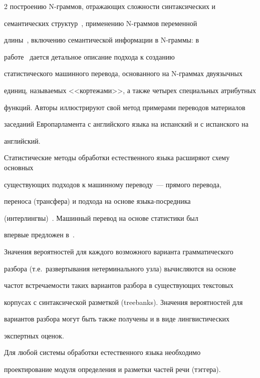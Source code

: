 \begin{multicols}{2}
построению N-грам\-мов, от\-ра\-жа\-ющих сложности синтаксических и 


семантических структур~\cite{29koz, 30koz}, применению N-грам\-мов переменной 


длины~\cite{31koz}, включению семантической информации в N-грам\-мы: в 


работе~\cite{32koz} дается детальное описание подхода к созданию 


статистического машинного перевода, основанного на N-грам\-мах двуязычных 


единиц, называемых <<кортежами>>, а также четырех специальных атрибутных 


функций. Авторы иллюстрируют свой метод примерами переводов материалов 


заседаний Европарламента с английского языка на испанский и с испанского на 


английский.





Статистические методы обработки естественного языка расширяют схему основных 


су\-ще\-ст\-ву\-ющих подходов к машинному переводу~--- прямого перевода, 


переноса (трансфера) и подхода на основе языка-посредника 


(интерлингвы)~\cite{33koz, 34koz}. Машинный перевод на основе статистики был 


впервые предложен в~\cite{35koz, 36koz}.





Значения вероятностей для каждого возможного варианта грамматического


разбора (т.е.\ развертывания нетерминального узла) вычисляются на основе


частот встречаемости таких вариантов разбора в существующих текстовых


корпусах с синтаксической разметкой (treebanks). Значения вероятностей для


вариантов разбора могут быть также получены и в виде лингвистических


экспертных оценок.





Для любой системы обработки естественного языка необходимо


проектирование модуля определения и разметки частей речи (тэггера).



\end{multicols}
